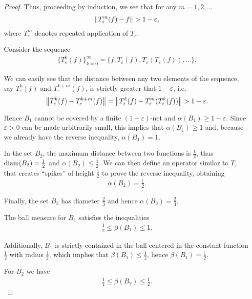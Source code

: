 \begin{proof}
  Thus, proceeding by induction, we see that for any $m = 1, 2, \ldots$
  \begin{align*}
    \left\Vert T_\varepsilon^m(f) - f \right\Vert > 1 - \varepsilon,
  \end{align*}
  where $T_\varepsilon^m$ denotes repeated application of $T_\varepsilon$.

  Consider the sequence
  \begin{align*}
    \{ T_\varepsilon^k(f) \}_{k=0}^\infty = \{ f, T_\varepsilon(f), T_\varepsilon(T_\varepsilon(f)), \ldots \}.
  \end{align*}

  We can easily see that the distance between any two elements of the sequence, say $T_\varepsilon^k(f)$ and $T_\varepsilon^{k+m}(f)$, is strictly greater that $1 - \varepsilon$, i.e.
  \begin{align*}
    \left\Vert T_\varepsilon^k(f) - T_\varepsilon^{k+m}(f) \right\Vert
    =
    \left\Vert T_\varepsilon^k(f) - T_\varepsilon^m(T_\varepsilon^k(f)) \right\Vert
    >
    1 - \varepsilon.
  \end{align*}

  Hence $B_1$ cannot be covered by a finite $(1-\varepsilon)$-net and $\alpha(B_1) \geq 1 - \varepsilon$. Since $\varepsilon > 0$ can be made arbitrarily small, this implies that $\alpha(B_1) \geq 1$ and, because we already have the reverse inequality, $\alpha(B_1) = 1$.

  In the set $B_2$, the maximum distance between two functions is $\frac 1 2$, thus $\operatorname{diam}(B_2) = \frac 1 2$ and $\alpha(B_2) \leq \frac 1 2$. We can then define an operator similar to $T_\varepsilon$ that creates \enquote{spikes} of height $\frac 1 2$ to prove the reverse inequality, obtaining
  \begin{align*}
    \alpha(B_2) = \frac 1 2.
  \end{align*}

  Finally, the set $B_3$ has diameter $\frac 2 3$ and hence $\alpha(B_3) = \frac 2 3$.

  The ball measure for $B_1$ satisfies the inequalities
  \begin{align*}
    \frac 1 2 \leq \beta(B_1) \leq 1.
  \end{align*}

  Additionally, $B_1$ is strictly contained in the ball centered in the constant function $\frac 1 2$ with radius $\frac 1 2$, which implies that $\beta(B_1) \leq \frac 1 2$, hence $\beta(B_1) = \frac 1 2$.

  For $B_2$ we have
  \begin{align*}
    \frac 1 4 \leq \beta(B_2) \leq \frac 1 2.
  \end{align*}


\end{proof}

